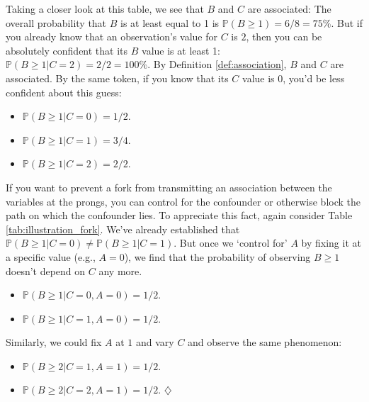 \documentclass[a4paper]{tufte-book}\usepackage[]{graphicx}\usepackage[]{xcolor}
\newcommand*{\parend}[1][$\diamondsuit$]{%
  \unskip\nobreak\hspace{1em plus 1fill}$\diamondsuit$%
}
\begin{document}
Taking a closer look at this table, we see that $B$ and $C$ are associated:
The overall probability that $B$ is at least equal to 1 is $\mathbb{P}(B \geq 1) = 6/8 = 75\%$. But if you already know
that an observation's value for $C$ is $2$, then you can be absolutely confident
that its $B$ value is at least 1: $\mathbb{P}(B \geq 1 | C = 2) = 2/2 = 100\%$.
By Definition \ref{def:association}, $B$ and $C$ are associated.
By the same token, if you know that its $C$ value
is $0$, you'd be less confident about this guess:

\begin{itemize}
 \item $\mathbb{P}(B \geq 1 | C = 0) = 1/2.$
 \item $\mathbb{P}(B \geq 1 | C = 1) = 3/4.$
 \item $\mathbb{P}(B \geq 1 | C = 2) = 2/2.$
\end{itemize}

If you want to prevent a fork from transmitting an association between the variables
at the prongs, you can control for the confounder or otherwise block the path on which
the confounder lies.
To appreciate this fact, again consider Table \ref{tab:illustration_fork}. We've already
established that $\mathbb{P}(B \geq 1 | C = 0) \neq \mathbb{P}(B \geq 1 | C = 1)$. But once
we `control for' $A$ by fixing it at a specific value (e.g., $A = 0$), we find
that the probability of observing $B \geq 1$ doesn't depend on $C$ any more.

\begin{itemize}
 \item $\mathbb{P}(B \geq 1 | C = 0, A = 0) = 1/2.$
 \item $\mathbb{P}(B \geq 1 | C = 1, A = 0) = 1/2.$
\end{itemize}

Similarly, we could fix $A$ at $1$ and vary $C$ and observe the same phenomenon:

\begin{itemize}
 \item $\mathbb{P}(B \geq 2 | C = 1, A = 1) = 1/2.$
 \item $\mathbb{P}(B \geq 2 | C = 2, A = 1) = 1/2.$ \parend
\end{itemize}
\end{document}
